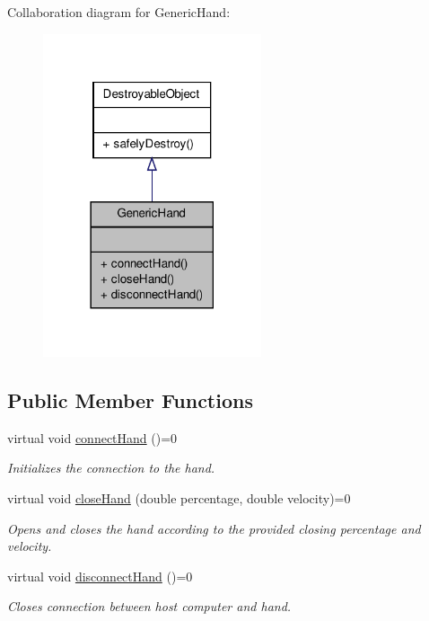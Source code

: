 \-Collaboration diagram for \-Generic\-Hand\-:\nopagebreak
\begin{figure}[H]
\begin{center}
\leavevmode
\includegraphics[width=182pt]{classGenericHand__coll__graph}
\end{center}
\end{figure}
\subsection*{\-Public \-Member \-Functions}
\begin{DoxyCompactItemize}
\item 
virtual void \hyperlink{classGenericHand_ab8e8610f2ceed53ab3112ceef60e1cd0}{connect\-Hand} ()=0
\begin{DoxyCompactList}\small\item\em \-Initializes the connection to the hand. \end{DoxyCompactList}\item 
virtual void \hyperlink{classGenericHand_a88be8d6c42cfd7b48da1df7da68d2aca}{close\-Hand} (double percentage, double velocity)=0
\begin{DoxyCompactList}\small\item\em \-Opens and closes the hand according to the provided closing percentage and velocity. \end{DoxyCompactList}\item 
virtual void \hyperlink{classGenericHand_acb5b9fff34fc22b9cebbc7d927ec4aa6}{disconnect\-Hand} ()=0
\begin{DoxyCompactList}\small\item\em \-Closes connection between host computer and hand. \end{DoxyCompactList}\end{DoxyCompactItemize}


